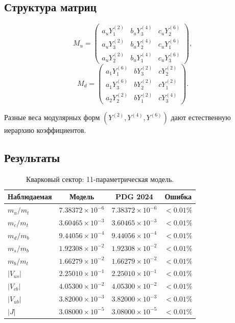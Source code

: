 \documentclass[12pt,a4paper]{article}
\numberwithin{equation}{section}
\begin{document}
\subsection{Структура матриц}

\begin{equation}
M_u = \begin{pmatrix} a_u Y_1^{(2)} & b_u Y_3^{(4)} & c_u Y_2^{(6)} \\ 
a_u Y_3^{(2)} & b_u Y_2^{(4)} & c_u Y_1^{(6)} \\
a_u Y_2^{(2)} & b_u Y_1^{(4)} & c_u Y_3^{(6)} \end{pmatrix},
\end{equation}
\begin{equation}
M_d = \begin{pmatrix} a_1 Y_1^{(6)} & b Y_3^{(2)} & c Y_2^{(2)} \\ 
a_1 Y_3^{(6)} & b Y_2^{(2)} & c Y_1^{(2)} \\
a_2 Y_2^{(2)} & b Y_1^{(2)} & c Y_3^{(4)} \end{pmatrix}.
\end{equation}

Разные веса модулярных форм $(Y^{(2)}, Y^{(4)}, Y^{(6)})$ дают 
естественную иерархию коэффициентов.

\subsection{Результаты}

\begin{table}[H]
\centering
\caption{Кварковый сектор: 11-параметрическая модель.}
\begin{tabular}{lccc}
\toprule
Наблюдаемая & Модель & PDG 2024 & Ошибка \\
\midrule
$m_u/m_t$ & $7.38372\times 10^{-6}$ & $7.38372\times 10^{-6}$ & $<0.01\%$ \\
$m_c/m_t$ & $3.60465\times 10^{-3}$ & $3.60465\times 10^{-3}$ & $<0.01\%$ \\
$m_d/m_b$ & $9.44056\times 10^{-4}$ & $9.44056\times 10^{-4}$ & $<0.01\%$ \\
$m_s/m_b$ & $1.92308\times 10^{-2}$ & $1.92308\times 10^{-2}$ & $<0.01\%$ \\
$m_b/m_t$ & $1.66279\times 10^{-2}$ & $1.66279\times 10^{-2}$ & $<0.01\%$ \\
$|V_{us}|$ & $2.25010\times 10^{-1}$ & $2.25010\times 10^{-1}$ & $<0.01\%$ \\
$|V_{cb}|$ & $4.05300\times 10^{-2}$ & $4.05300\times 10^{-2}$ & $<0.01\%$ \\
$|V_{ub}|$ & $3.82000\times 10^{-3}$ & $3.82000\times 10^{-3}$ & $<0.01\%$ \\
$|J|$ & $3.08000\times 10^{-5}$ & $3.08000\times 10^{-5}$ & $<0.01\%$ \\
\bottomrule
\end{tabular}
\end{table}
\end{document}
